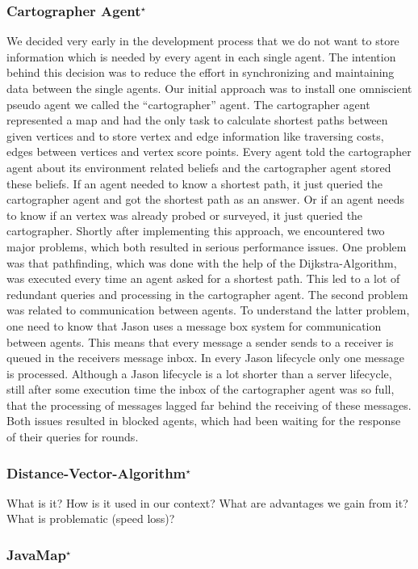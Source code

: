 \subsubsection[Cartographer Agent]{Cartographer Agent$^\star$}\label{alg:map_cartographer}
We decided very early in the development process that we do not want to store information which is needed by every agent in each single agent. The intention behind this decision was to reduce the effort in synchronizing and maintaining data between the single agents. Our initial approach was to install one omniscient pseudo agent we called the ``cartographer'' agent. The cartographer agent represented a map and had the only task to calculate shortest paths between given vertices and to store vertex and edge information like traversing costs, edges between vertices and vertex score points. Every agent told the cartographer agent about its environment related beliefs and the cartographer agent stored these beliefs. If an agent needed to know a shortest path, it just queried the cartographer agent and got the shortest path as an answer. Or if an agent needs to know if an vertex was already probed or surveyed, it just queried the cartographer. Shortly after implementing this approach, we encountered two major problems, which both resulted in serious performance issues. One problem was that pathfinding, which was done with the help of the Dijkstra-Algorithm, was executed every time an agent asked for a shortest path. This led to a lot of redundant queries and processing in the cartographer agent. The second problem was related to communication between agents. To understand the latter problem, one need to know that Jason uses a message box system for communication between agents. This means that every message a sender sends to a receiver is queued in the receivers message inbox. In every Jason lifecycle only one message is processed. Although a Jason lifecycle is a lot shorter than a server lifecycle, still after some execution time the inbox of the cartographer agent was so full, that the processing of messages lagged far behind the receiving of these messages. Both issues resulted in blocked agents, which had been waiting for the response of their queries for rounds.


\subsubsection[Distance-Vector-Algorithm]{Distance-Vector-Algorithm$^\star$}\label{alg:map_dv}
What is it? How is it used in our context? What are advantages we gain from it? What is problematic (speed loss)?

\subsubsection[JavaMap]{JavaMap$^\star$}\label{alg:map_javamap}